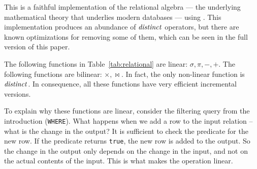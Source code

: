 %
%
%
%
%
%

This is a faithful implementation of the relational algebra --- the
underlying mathematical theory that underlies modern databases ---
using \zrs.  This implementation produces an abundance of $\mathit{distinct}$
operators, but there are known optimizations for removing some of
them, which can be seen in the full version of this paper.

The following functions in Table~\ref{tab:relational} are linear:
$\sigma, \pi, -, +$.  The following functions are bilinear: $\times,
\bowtie$.  In fact, the only non-linear function is $\mathit{distinct}$.  In
consequence, all these functions have very efficient incremental
versions.

To explain why these functions are linear, consider the filtering
query from the introduction (\texttt{WHERE}).  What happens when we
add a row to the input relation -- what is the change in the output?
It is sufficient to check the predicate for the new row.  If the
predicate returns \texttt{true}, the new row is added to the output.
So the change in the output only depends on the change in the input,
and not on the actual contents of the input.  This is what makes the
operation linear.

